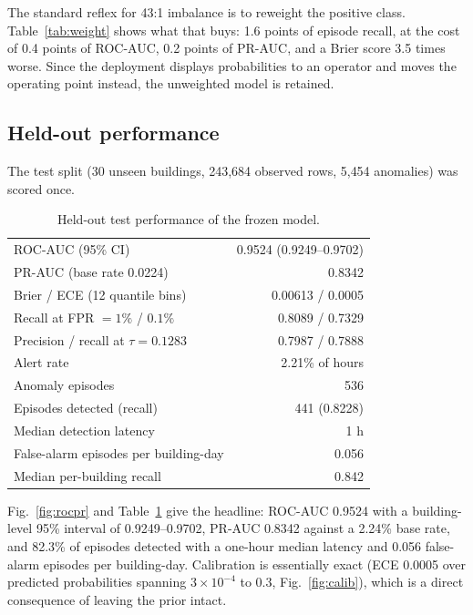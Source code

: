 \documentclass[conference]{IEEEtran}
\begin{document}
The standard reflex for 43:1 imbalance is to reweight the positive class. Table~\ref{tab:weight} shows
what that buys: 1.6 points of episode recall, at the cost of 0.4 points of ROC-AUC, 0.2 points of
PR-AUC, and a Brier score 3.5 times worse. Since the deployment displays probabilities to an operator
and moves the operating point instead, the unweighted model is retained.

\subsection{Held-out performance}

The test split (30 unseen buildings, 243{,}684 observed rows, 5{,}454 anomalies) was scored once.

\begin{table}[t]
\centering
\caption{Held-out test performance of the frozen model.}
\label{tab:test}
\small
\begin{tabular}{lr}
\toprule
ROC-AUC (95\% CI) & 0.9524 (0.9249--0.9702) \\
PR-AUC (base rate 0.0224) & 0.8342 \\
Brier / ECE (12 quantile bins) & 0.00613 / 0.0005 \\
Recall at FPR $=1\%$ / $0.1\%$ & 0.8089 / 0.7329 \\
Precision / recall at $\tau=0.1283$ & 0.7987 / 0.7888 \\
Alert rate & 2.21\% of hours \\
Anomaly episodes & 536 \\
Episodes detected (recall) & 441 (0.8228) \\
Median detection latency & 1 h \\
False-alarm episodes per building-day & 0.056 \\
Median per-building recall & 0.842 \\
\bottomrule
\end{tabular}
\end{table}

Fig.~\ref{fig:rocpr} and Table~\ref{tab:test} give the headline: ROC-AUC 0.9524 with a building-level
95\% interval of 0.9249--0.9702, PR-AUC 0.8342 against a 2.24\% base rate, and 82.3\% of episodes
detected with a one-hour median latency and 0.056 false-alarm episodes per building-day. Calibration is
essentially exact (ECE 0.0005 over predicted probabilities spanning $3\times10^{-4}$ to $0.3$,
Fig.~\ref{fig:calib}), which is a direct consequence of leaving the prior intact.
\end{document}
